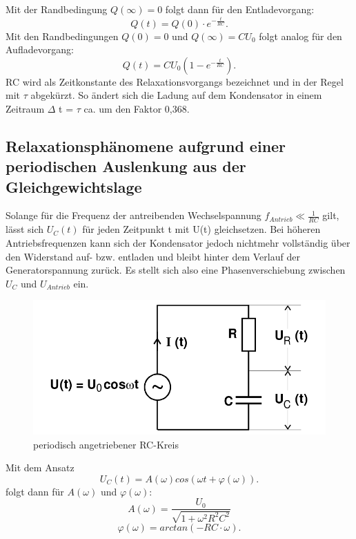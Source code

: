 Mit der Randbedingung $ Q(\infty)=0$ folgt dann für den Entladevorgang:
\begin{equation}
  Q(t) = Q(0) \cdot e^{-\frac{t}{RC}}\text{.}
\end{equation}
Mit den Randbedingungen $Q(0) = 0 $ und $Q(\infty) = CU_0$ folgt analog für
den Aufladevorgang:
\begin{equation}
  Q(t) = CU_0 \left(1-e^{-\frac{t}{RC}}\right)\text{.}
\end{equation}
RC wird als Zeitkonstante des Relaxationsvorgangs bezeichnet und in der Regel mit
 $\tau$ abgekürzt. So ändert sich die Ladung auf dem Kondensator in einem Zeitraum
 $\Delta$ t = $\tau$ ca. um den Faktor 0,368.

 \subsection{Relaxationsphänomene aufgrund einer periodischen Auslenkung aus der Gleichgewichtslage}

 Solange für die Frequenz der antreibenden Wechselspannung $ f_{Antrieb} \ll \frac{1}{RC} $ gilt, lässt sich
 $U_C(t)$ für jeden Zeitpunkt t mit U(t) gleichsetzen. Bei höheren Antriebsfrequenzen
 kann sich der Kondensator jedoch nichtmehr vollständig über den Widerstand
  auf- bzw. entladen und bleibt hinter dem Verlauf der Generatorspannung zurück.
  Es stellt sich also eine Phasenverschiebung zwischen $U_C$ und $U_{Antrieb}$ ein.

\begin{figure}[H]
  \centering

  \includegraphics[width=\linewidth-200pt,height=\textheight-200pt,keepaspectratio]{content/RC_Kreis2.png}
  \caption{periodisch angetriebener RC-Kreis \cite{V353}}
  \label{fig:RC_Kreis2}
\end{figure}

  Mit dem Ansatz
  \begin{equation}
  U_C(t) = A(\omega)cos(\omega t+\varphi(\omega))\text{.}
  \end{equation}
  folgt dann für $A(\omega)$ und $\varphi(\omega)$:
  \begin{equation}
    A(\omega) = \frac{U_0}{\sqrt{1+\omega^2R^2C^2}}
  \end{equation}
  \begin{equation}
    \varphi(\omega) = arctan(-RC \cdot \omega)\text{.}
  \end{equation}

